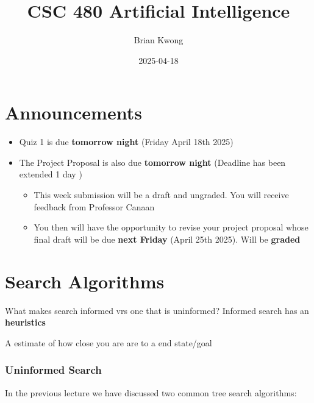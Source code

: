\documentclass[
  letterpaper,
  DIV=11,
  numbers=noendperiod]{scrartcl}
\title{CSC 480 Artificial Intelligence}
\author{Brian Kwong}
\date{2025-04-18}
\providecommand{\tightlist}{%
  \setlength{\itemsep}{0pt}\setlength{\parskip}{0pt}}\usepackage{longtable,booktabs,array}
\renewcommand*\contentsname{Table of contents}
\newcommand\contentsname{Table of contents}
\begin{document}
\maketitle

\renewcommand*\contentsname{Table of contents}
{
\hypersetup{linkcolor=}
\setcounter{tocdepth}{5}
\tableofcontents
}

\section{Announcements}\label{announcements}

\begin{itemize}
\tightlist
\item
  Quiz 1 is due \textbf{tomorrow night} (Friday April 18th 2025)
\item
  The Project Proposal is also due \textbf{tomorrow night} (Deadline has
  been extended 1 day )

  \begin{itemize}
  \tightlist
  \item
    This week submission will be a draft and ungraded. You will receive
    feedback from Professor Canaan
  \item
    You then will have the opportunity to revise your project proposal
    whose final draft will be due \textbf{next Friday} (April 25th
    2025). Will be \textbf{graded}
  \end{itemize}
\end{itemize}

\section{Search Algorithms}\label{search-algorithms}

What makes search informed vrs one that is uninformed? Informed search
has an \textbf{heuristics}

\begin{description}
\tightlist
\item[Heuristics]
A estimate of how close you are are to a end state/goal
\end{description}

\subsubsection{Uninformed Search}\label{uninformed-search}

In the previous lecture we have discussed two common tree search
algorithms:
\end{document}
